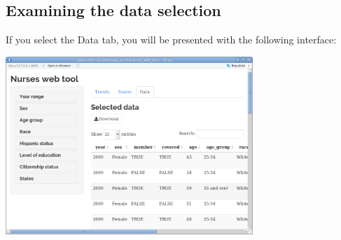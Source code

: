 \documentclass[letterpaper,12pt]{article}
\begin{document}
\subsection{Examining the data selection}

If you select the Data tab, you will be presented with the following
interface:

\begin{center}
  \includegraphics[width=0.7\textwidth]{images/data_interface.png}
\end{center}

\end{document}
